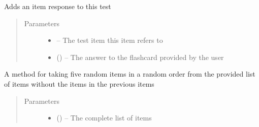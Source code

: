 \documentclass[letterpaper,10pt,english]{sphinxmanual}
\begin{document}
\begin{fulllineitems}
\begin{fulllineitems}
\end{fulllineitems}


\begin{fulllineitems}
\label{\detokenize{test:test.Test.append_item}}
Adds an item response to this test
\begin{quote}\begin{description}
\item[{Parameters}] \leavevmode\begin{itemize}
\item {} 
 -- The test item this item refers to

\item {} 
 (\href{https://docs.python.org/2/library/string.html\#module-string}{}) -- The answer to the flashcard provided by the user

\end{itemize}

\end{description}\end{quote}

\end{fulllineitems}


\begin{fulllineitems}
\label{\detokenize{test:test.Test.generate_test}}
A method for taking five random items in a random order from the provided list of items without the items in the previous items
\begin{quote}\begin{description}
\item[{Parameters}] \leavevmode\begin{itemize}
\item {} 
 (\href{https://docs.python.org/2/library/functions.html\#list}{}\href{https://docs.python.org/2/library/functions.html\#list}{}\sphinxstyleliteralemphasis{)}\sphinxstyleliteralemphasis{}) -- The complete list of items


\end{itemize}
\end{description}
\end{quote}
\end{fulllineitems}
\end{fulllineitems}
\end{document}
